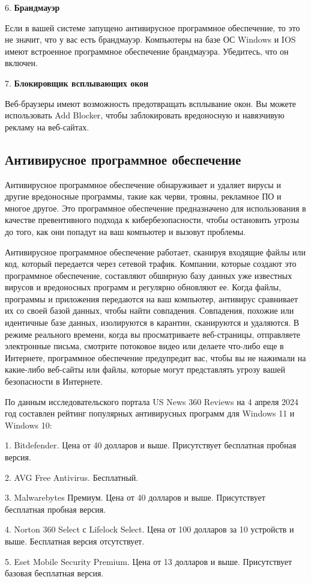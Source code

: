 6.	\textbf{Брандмауэр}

Если в вашей системе запущено антивирусное программное обеспечение, то это не значит, что у вас есть брандмауэр. Компьютеры на базе ОС Windows и IOS имеют встроенное программное обеспечение брандмауэра. Убедитесь, что он включен.

7.	\textbf{Блокировщик всплывающих окон} 

Веб-браузеры имеют возможность предотвращать всплывание окон. Вы можете использовать Add Blocker, чтобы заблокировать вредоносную и навязчивую рекламу на веб-сайтах.

\subsection{Антивирусное программное обеспечение}

Антивирусное программное обеспечение обнаруживает и удаляет вирусы и другие вредоносные программы, такие как черви, трояны, рекламное ПО и многое другое. Это программное обеспечение предназначено для использования в качестве превентивного подхода к кибербезопасности, чтобы остановить угрозы до того, как они попадут на ваш компьютер и вызовут проблемы.

Антивирусное программное обеспечение работает, сканируя входящие файлы или код, который передается через сетевой трафик. Компании, которые создают это программное обеспечение, составляют обширную базу данных уже известных вирусов и вредоносных программ и регулярно обновляют ее. Когда файлы, программы и приложения передаются на ваш компьютер, антивирус сравнивает их со своей базой данных, чтобы найти совпадения. Совпадения, похожие или идентичные базе данных, изолируются в карантин, сканируются и удаляются. В режиме реального времени, когда вы просматриваете веб-страницы, отправляете электронные письма, смотрите потоковое видео или делаете что-либо еще в Интернете, программное обеспечение предупредит вас, чтобы вы не нажимали на какие-либо веб-сайты или файлы, которые могут представлять угрозу вашей безопасности в Интернете.

По данным исследовательского портала US News 360 Reviews на 4 апреля 2024 год составлен рейтинг популярных антивирусных программ для Windows 11 и Windows 10:

1. Bitdefender. Цена от 40 долларов и выше. Присутствует бесплатная пробная версия.

2. AVG Free Antivirus. Бесплатный. 

3. Malwarebytes Премиум. Цена от 40 долларов и выше. Присутствует бесплатная пробная версия.

4. Norton 360 Select с Lifelock Select. Цена от 100 долларов за 10 устройств и выше. Бесплатная версия отсутствует.

5. Eset Mobile Security Premium. Цена от 13 долларов и выше. Присутствует базовая бесплатная версия.

